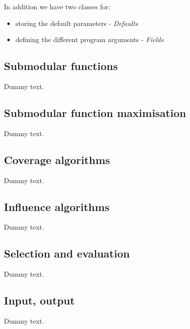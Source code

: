 In addition we have two classes for:
\begin{itemize}
  \item storing the default parameters - \emph{Defaults}
  \item defining the different program arguments - \emph{Fields}
\end{itemize}

\subsection{Submodular functions}

Dummy text.

\subsection{Submodular function maximisation}

Dummy text.

\subsection{Coverage algorithms}

Dummy text.

\subsection{Influence algorithms}

Dummy text.

\subsection{Selection and evaluation}

Dummy text.

\subsection{Input, output}

Dummy text.

